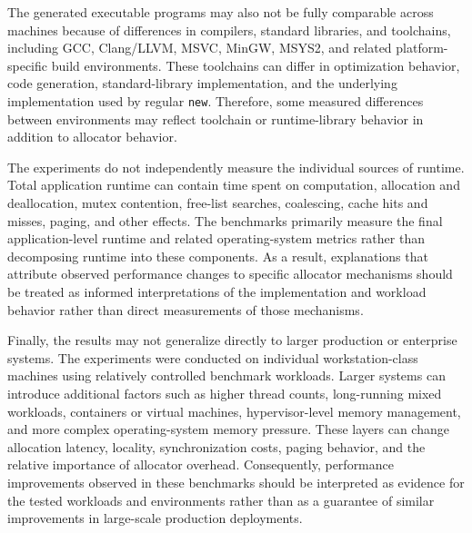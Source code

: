 The generated executable programs may also not be fully comparable across machines because of differences in compilers, standard libraries, and toolchains, including GCC, Clang/LLVM, MSVC, MinGW, MSYS2, and related platform-specific build environments. These toolchains can differ in optimization behavior, code generation, standard-library implementation, and the underlying implementation used by regular \texttt{new}. Therefore, some measured differences between environments may reflect toolchain or runtime-library behavior in addition to allocator behavior.

The experiments do not independently measure the individual sources of runtime. Total application runtime can contain time spent on computation, allocation and deallocation, mutex contention, free-list searches, coalescing, cache hits and misses, paging, and other effects. The benchmarks primarily measure the final application-level runtime and related operating-system metrics rather than decomposing runtime into these components. As a result, explanations that attribute observed performance changes to specific allocator mechanisms should be treated as informed interpretations of the implementation and workload behavior rather than direct measurements of those mechanisms.

Finally, the results may not generalize directly to larger production or enterprise systems. The experiments were conducted on individual workstation-class machines using relatively controlled benchmark workloads. Larger systems can introduce additional factors such as higher thread counts, long-running mixed workloads, containers or virtual machines, hypervisor-level memory management, and more complex operating-system memory pressure. These layers can change allocation latency, locality, synchronization costs, paging behavior, and the relative importance of allocator overhead. Consequently, performance improvements observed in these benchmarks should be interpreted as evidence for the tested workloads and environments rather than as a guarantee of similar improvements in large-scale production deployments.
